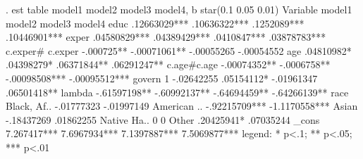 . est table model1 model2 model3 model4, b star(0.1 0.05 0.01)
{\smallskip}
    Variable {\VBAR}    model1          model2          model3          model4      
        educ {\VBAR}  .12663029***    .10636322***     .1252089***    .10446901***  
       exper {\VBAR}  .04580829***    .04389429***     .0410847***    .03878783***  
             {\VBAR}
     c.exper\#{\VBAR}
     c.exper {\VBAR}   -.000725**    -.00071061**    -.00055265      -.00054552     
             {\VBAR}
         age {\VBAR}  .04810982*      .04398279*      .06371844**     .06291247**   
             {\VBAR}
 c.age\#c.age {\VBAR} -.00074352**     -.0006758**    -.00098508***   -.00095512***  
             {\VBAR}
      govern {\VBAR}
          1  {\VBAR} -.02642255       .05154112*     -.01961347       .06501418**   
             {\VBAR}
      lambda {\VBAR} -.61597198**    -.60992137**    -.64694459**    -.64266139**   
             {\VBAR}
        race {\VBAR}
Black, Af..  {\VBAR}                                 -.01777323      -.01997149     
American ..  {\VBAR}                                 -.92215709***   -1.1170558***  
      Asian  {\VBAR}                                 -.18437269       .01862255     
Native Ha..  {\VBAR}                                          0               0     
      Other  {\VBAR}                                  .20425941*      .07035244     
             {\VBAR}
       _cons {\VBAR}   7.267417***    7.6967934***    7.1397887***    7.5069877***  
                                           legend: * p<.1; ** p<.05; *** p<.01

